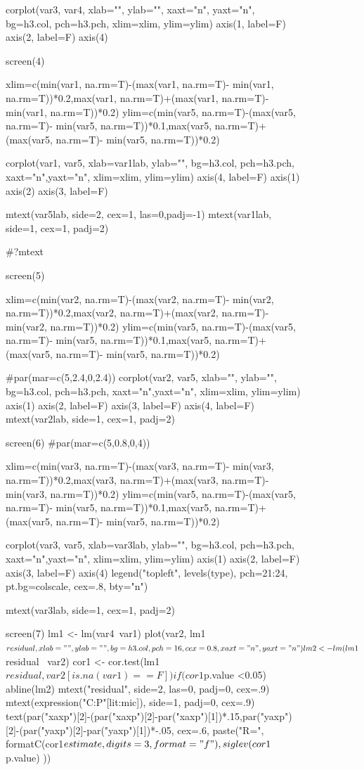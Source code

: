 \documentclass[10pt]{article}
\begin{document}
\begin{flushleft}
\begin{figure}[h!]
\begin{center}
corplot(var3, var4, xlab="", ylab="", xaxt="n", yaxt="n", bg=h3.col, pch=h3.pch, xlim=xlim, ylim=ylim)
axis(1, label=F)
axis(2, label=F)
axis(4)

screen(4)

xlim=c(min(var1, na.rm=T)-(max(var1, na.rm=T)- min(var1, na.rm=T))*0.2,max(var1, na.rm=T)+(max(var1, na.rm=T)- min(var1, na.rm=T))*0.2)
ylim=c(min(var5, na.rm=T)-(max(var5, na.rm=T)- min(var5, na.rm=T))*0.1,max(var5, na.rm=T)+(max(var5, na.rm=T)- min(var5, na.rm=T))*0.2)

corplot(var1, var5, xlab=var1lab, ylab="", bg=h3.col, pch=h3.pch, xaxt="n",yaxt="n", xlim=xlim, ylim=ylim)
axis(4, label=F)
axis(1)
axis(2)
axis(3, label=F)

mtext(var5lab, side=2, cex=1, las=0,padj=-1)
mtext(var1lab, side=1, cex=1, padj=2)

#?mtext

screen(5)

xlim=c(min(var2, na.rm=T)-(max(var2, na.rm=T)- min(var2, na.rm=T))*0.2,max(var2, na.rm=T)+(max(var2, na.rm=T)- min(var2, na.rm=T))*0.2)
ylim=c(min(var5, na.rm=T)-(max(var5, na.rm=T)- min(var5, na.rm=T))*0.1,max(var5, na.rm=T)+(max(var5, na.rm=T)- min(var5, na.rm=T))*0.2)


#par(mar=c(5,2.4,0,2.4))
corplot(var2, var5, xlab="", ylab="", bg=h3.col, pch=h3.pch, xaxt="n",yaxt="n", xlim=xlim, ylim=ylim)
axis(1)
axis(2, label=F)
axis(3, label=F)
axis(4, label=F)
mtext(var2lab, side=1, cex=1, padj=2)

screen(6)
#par(mar=c(5,0.8,0,4))

xlim=c(min(var3, na.rm=T)-(max(var3, na.rm=T)- min(var3, na.rm=T))*0.2,max(var3, na.rm=T)+(max(var3, na.rm=T)- min(var3, na.rm=T))*0.2)
ylim=c(min(var5, na.rm=T)-(max(var5, na.rm=T)- min(var5, na.rm=T))*0.1,max(var5, na.rm=T)+(max(var5, na.rm=T)- min(var5, na.rm=T))*0.2)

corplot(var3, var5, xlab=var3lab, ylab="", bg=h3.col, pch=h3.pch, xaxt="n",yaxt="n", xlim=xlim, ylim=ylim)
axis(1)
axis(2, label=F)
axis(3, label=F)
axis(4)
legend("topleft", levels(type), pch=21:24, pt.bg=colscale,  cex=.8, bty="n")

mtext(var3lab, side=1, cex=1, padj=2)


screen(7)
lm1 <- lm(var4~var1)
plot(var2, lm1$residual, xlab="", ylab="", bg=h3.col, pch=16, cex=0.8, xaxt="n",yaxt="n")
lm2 <- lm(lm1$residual~ var2)
cor1 <- cor.test(lm1$residual, var2[is.na(var1)==F])
if (cor1$p.value <0.05) {
  abline(lm2)
}
mtext("residual", side=2, las=0, padj=0, cex=.9)
mtext(expression("C:P"[lit:mic]), side=1,  padj=0, cex=.9)
text(par("xaxp")[2]-(par("xaxp")[2]-par("xaxp")[1])*.15,par("yaxp")[2]-(par("yaxp")[2]-par("yaxp")[1])*-.05, cex=.6, paste("R=", formatC(cor1$estimate, digits=3, format="f"), siglev(cor1$p.value) ))


\end{center}
\end{figure}
\end{flushleft}
\end{document}
